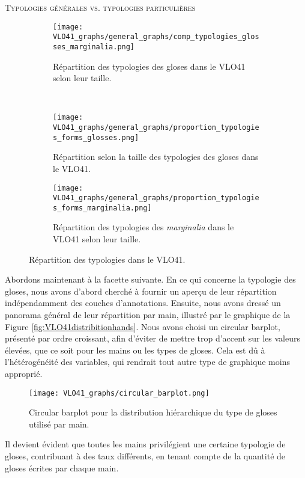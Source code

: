 \documentclass[a4paper, twoside, 12pt]{book}
\begin{document}
{\textsc{Typologies générales vs. typologies particulières}

\begin{figure}[H]
\centering
\begin{subfigure}{0.80\textwidth}
  \centering
  \texttt{[image: VLO41\_graphs/general\_graphs/comp\_typologies\_glosses\_marginalia.png]}
  \caption{Répartition des typologies des gloses dans le VLO41 selon leur taille.}
  \label{fig:general_typologies}
\end{subfigure}
\\
\hfill
\begin{subfigure}{0.45\textwidth}
  \centering
  \texttt{[image: VLO41\_graphs/general\_graphs/proportion\_typologies\_forms\_glosses.png]}
 \caption{Répartition selon la taille des typologies des gloses dans le VLO41.}
  \label{fig:VLO41typologies_glosses}
\end{subfigure}
\begin{subfigure}{0.45\textwidth}
  \centering
  \texttt{[image: VLO41\_graphs/general\_graphs/proportion\_typologies\_forms\_marginalia.png]}
    \caption{Répartition des typologies des \textit{marginalia} dans le VLO41 selon leur taille.}
  \label{fig:VLO41typologies_marginalia}
\end{subfigure}
\caption{Répartition des typologies dans le VLO41.}
\label{fig:VLO41typologies}
\end{figure}


Abordons maintenant à la facette suivante. En ce qui concerne la typologie des gloses, nous avons d'abord cherché à fournir un aperçu de leur répartition indépendamment des couches d'annotations. Ensuite, nous avons dressé un panorama général de leur répartition par main, illustré par le graphique de la Figure \ref{fig:VLO41distribitionhands}. Nous avons choisi un circular barplot, présenté par ordre croissant, afin d'éviter de mettre trop d'accent sur les valeurs élevées, que ce soit pour les mains ou les types de gloses. Cela est dû à l'hétérogénéité des variables, qui rendrait tout autre type de graphique moins approprié.\\


\begin{figure}[H]
    \centering
    \texttt{[image: VLO41\_graphs/circular\_barplot.png]}
    \caption{Circular barplot pour la distribution hiérarchique du type de gloses utilisé par main.}
\end{figure}

Il devient évident que toutes les mains privilégient une certaine typologie de gloses, contribuant à des taux différents, en tenant compte de la quantité de gloses écrites par chaque main. \\


}
\end{document}

